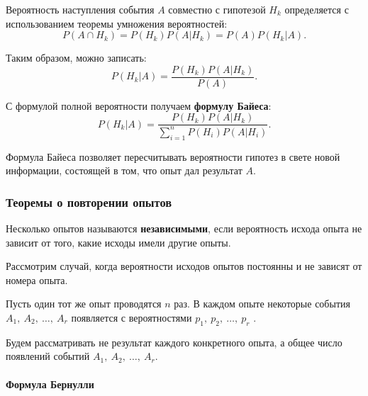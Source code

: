 \documentclass[a4paper]{article}
\newcommand{\key}[1]{{\bfseries\color{Medium} #1}}
\begin{document}
                Вероятность наступления события $A$ совместно с гипотезой $H_k$ определяется с использованием теоремы умножения вероятностей:
                \begin{equation*}
                    P(A \cap H_k) = P(H_k) P(A | H_k) = P(A) P(H_k | A) .
                \end{equation*}

                Таким образом, можно записать:
                \begin{equation*}
                    P(H_k | A) = \frac{P(H_k) P(A | H_k)}{P(A)} .
                \end{equation*}

                С формулой полной вероятности получаем \key{формулу Байеса}:
                \begin{equation*}
                    P(H_k | A) =
                        \frac{P(H_k) P(A | H_k)}{\sum\limits_{i = 1}^{n} P(H_i) P(A | H_i)} .
                \end{equation*}

                Формула Байеса позволяет пересчитывать вероятности гипотез в свете новой информации, состоящей в том, что опыт дал результат $A$.

            \subsubsection{Теоремы о повторении опытов}

                Несколько опытов называются \key{независимыми}, если вероятность исхода опыта не зависит от того, какие исходы имели другие опыты.
                
                Рассмотрим случай, когда вероятности исходов опытов постоянны и не зависят от номера опыта.
                
                Пусть один тот же опыт проводятся $n$ раз. В каждом опыте некоторые события $A_1 , \: A_2 , \: \ldots , \: A_r$ появляется с вероятностями $p_1 , \: p_2 , \: \ldots , \: p_r$ .
                
                Будем рассматривать не результат каждого конкретного опыта, а общее число появлений событий $A_1 , \: A_2 , \: \ldots , \: A_r$.

                \paragraph{Формула Бернулли}
\end{document}
